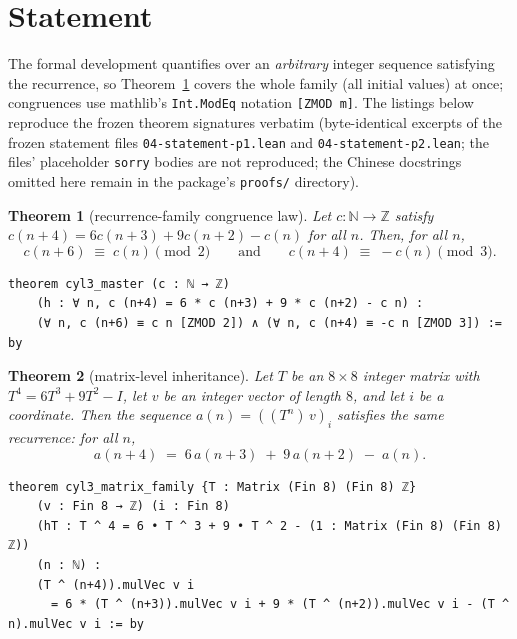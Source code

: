 \documentclass[11pt]{article}
\newtheorem{theorem}{Theorem}
\begin{document}
\section{Statement}

The formal development quantifies over an \emph{arbitrary} integer sequence
satisfying the recurrence, so Theorem~\ref{thm:master} covers the whole
family (all initial values) at once; congruences use mathlib's
\texttt{Int.ModEq} notation \texttt{[ZMOD m]}. The listings below reproduce
the frozen theorem signatures verbatim (byte-identical excerpts of the
frozen statement files \texttt{04-statement-p1.lean} and
\texttt{04-statement-p2.lean}; the files' placeholder \texttt{sorry} bodies
are not reproduced; the Chinese docstrings omitted here remain in the
package's \texttt{proofs/} directory).

\begin{theorem}[recurrence-family congruence law]\label{thm:master}
Let $c : \mathbb{N} \to \mathbb{Z}$ satisfy $c(n+4) = 6c(n+3) + 9c(n+2) -
c(n)$ for all $n$. Then, for all $n$,
\[
  c(n+6) \;\equiv\; c(n) \pmod 2
  \qquad\text{and}\qquad
  c(n+4) \;\equiv\; -c(n) \pmod 3.
\]
\end{theorem}

\begin{lstlisting}[caption={Formal statement of Theorem~\ref{thm:master} (verbatim excerpt, lines 11--13 of the frozen \texttt{formalized/04-statement-p1.lean}, sha256 \texttt{4740b9d5...e733bc}).},label={lst:p1}]
theorem cyl3_master (c : ℕ → ℤ)
    (h : ∀ n, c (n+4) = 6 * c (n+3) + 9 * c (n+2) - c n) :
    (∀ n, c (n+6) ≡ c n [ZMOD 2]) ∧ (∀ n, c (n+4) ≡ -c n [ZMOD 3]) := by
\end{lstlisting}

\begin{theorem}[matrix-level inheritance]\label{thm:matrix}
Let $T$ be an $8 \times 8$ integer matrix with $T^4 = 6T^3 + 9T^2 - I$,
let $v$ be an integer vector of length $8$, and let $i$ be a coordinate.
Then the sequence $a(n) = ((T^n)\,v)_i$ satisfies the same recurrence: for
all $n$,
\[
  a(n+4) \;=\; 6\,a(n+3) \;+\; 9\,a(n+2) \;-\; a(n).
\]
\end{theorem}

\begin{lstlisting}[caption={Formal statement of Theorem~\ref{thm:matrix} (verbatim excerpt, lines 13--18 of the frozen \texttt{formalized/04-statement-p2.lean}, sha256 \texttt{8cac6fa4...c1d7fe}).},label={lst:p2}]
theorem cyl3_matrix_family {T : Matrix (Fin 8) (Fin 8) ℤ}
    (v : Fin 8 → ℤ) (i : Fin 8)
    (hT : T ^ 4 = 6 • T ^ 3 + 9 • T ^ 2 - (1 : Matrix (Fin 8) (Fin 8) ℤ))
    (n : ℕ) :
    (T ^ (n+4)).mulVec v i
      = 6 * (T ^ (n+3)).mulVec v i + 9 * (T ^ (n+2)).mulVec v i - (T ^ n).mulVec v i := by
\end{lstlisting}
\end{document}
